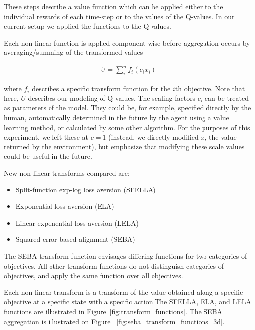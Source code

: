 These steps describe a value function which can be applied either to the individual rewards of each time-step or to the values of the Q-values. In our current setup we applied the functions to the Q values.

Each non-linear function is applied component-wise before aggregation occurs by averaging/summing of the transformed values

\begin{align}
\label{eq:meu}
U=\sum_{i}^n{f_i(c_i x_i)}
\end{align}

\noindent where ${f_i}$ describes a specific transform function for the $i$th objective. Note that here, $U$ describes our modeling of Q-values. The scaling factors $c_i$ can be treated as parameters of the model. They could be, for example, specified directly by the human, automatically determined in the future by the agent using a value learning method, or calculated by some other algorithm. 
For the purposes of this experiment, we left these at $c=1$ (instead, we directly modified $x$, the value returned by the environment), but emphasize that modifying these scale values could be useful in the future.


 New non-linear transforms compared are:

\begin{itemize}
    \item Split-function exp-log loss aversion (SFELLA)
    \item Exponential loss aversion (ELA)
    \item Linear-exponential loss aversion (LELA)
    \item Squared error based alignment (SEBA)
\end{itemize}

\noindent The SEBA transform function envisages differing functions for two categories of objectives. All other transform functions do not distinguish categories of objectives, and apply the same function over all objectives.

Each non-linear transform is a transform of the value obtained along a specific objective %
at a specific state %
with a specific action %
The SFELLA, ELA, and LELA functions are illustrated in Figure~\ref{fig:transform_functions}. The SEBA aggregation is illustrated on Figure ~\ref{fig:seba_transform_functions_3d}.


